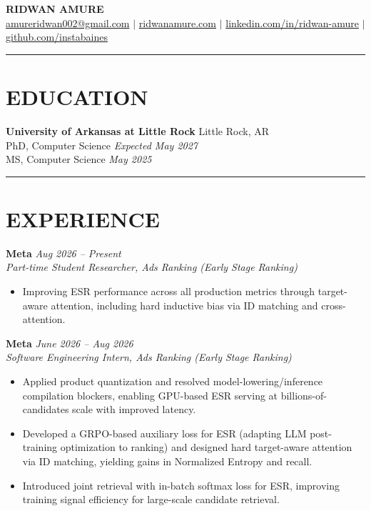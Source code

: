 \documentclass[10pt]{article}
\begin{document}
\begin{center}
{\Large\textbf{RIDWAN AMURE}} \\[3pt]
\small
\href{mailto:amureridwan002@gmail.com}{amureridwan002@gmail.com}
$|$ \href{https://ridwanamure.com}{ridwanamure.com}
$|$ \href{https://linkedin.com/in/ridwan-amure}{linkedin.com/in/ridwan-amure}
$|$ \href{https://github.com/instabaines}{github.com/instabaines}
\end{center}

\vspace{2pt}
\noindent\rule{\linewidth}{0.4pt}
\vspace{-6pt}

\section*{\small EDUCATION}
\vspace{-4pt}
\noindent\textbf{University of Arkansas at Little Rock} \hfill Little Rock, AR \\
PhD, Computer Science \hfill \textit{Expected May 2027} \\
MS, Computer Science \hfill \textit{May 2025}

\vspace{2pt}
\noindent\rule{\linewidth}{0.4pt}
\vspace{-6pt}

\section*{\small EXPERIENCE}
\vspace{-4pt}

\noindent\textbf{Meta} \hfill \textit{Aug 2026 -- Present} \\
\textit{Part-time Student Researcher, Ads Ranking (Early Stage Ranking)}
\begin{itemize}
  \item Improving ESR performance across all production metrics through target-aware attention, including hard inductive bias via ID matching and cross-attention.
\end{itemize}

\vspace{2pt}
\noindent\textbf{Meta} \hfill \textit{June 2026 -- Aug 2026} \\
\textit{Software Engineering Intern, Ads Ranking (Early Stage Ranking)}
\begin{itemize}
  \item Applied product quantization and resolved model-lowering/inference compilation blockers, enabling GPU-based ESR serving at billions-of-candidates scale with improved latency.
  \item Developed a GRPO-based auxiliary loss for ESR (adapting LLM post-training optimization to ranking) and designed hard target-aware attention via ID matching, yielding gains in Normalized Entropy and recall.
  \item Introduced joint retrieval with in-batch softmax loss for ESR, improving training signal efficiency for large-scale candidate retrieval.
\end{itemize}
\end{document}
